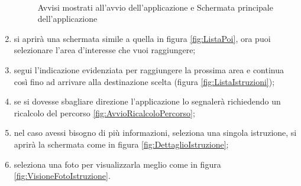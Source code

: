 \documentclass[../ClipsManualeUtente.tex]{subfiles}
\begin{document}
\begin{enumerate}
\begin{figure} [p]
			 \quad
			\hspace{1.5cm}
			 \\
			\caption{Avvisi mostrati all'avvio dell'applicazione e Schermata principale dell'applicazione}
		\end{figure}
			
			
		\newpage	
		
		\item si aprirà una schermata simile a quella in figura \ref{fig:ListaPoi}, ora puoi selezionare l'area d'interesse che vuoi raggiungere;
		\item segui l'indicazione evidenziata per raggiungere la prossima area e continua così fino ad arrivare alla destinazione scelta (figura \ref{fig:ListaIstruzioni});
		\item se si dovesse sbagliare direzione l'applicazione lo segnalerà richiedendo un ricalcolo del percorso \ref{fig:AvvioRicalcoloPercorso};
		\item nel caso avessi bisogno di più informazioni, seleziona una singola istruzione, si aprirà la schermata come in figura \ref{fig:DettaglioIstruzione};
		\item seleziona una foto per visualizzarla meglio come in figura \ref{fig:VisioneFotoIstruzione}.			
				
	\end{enumerate}
\end{document}
